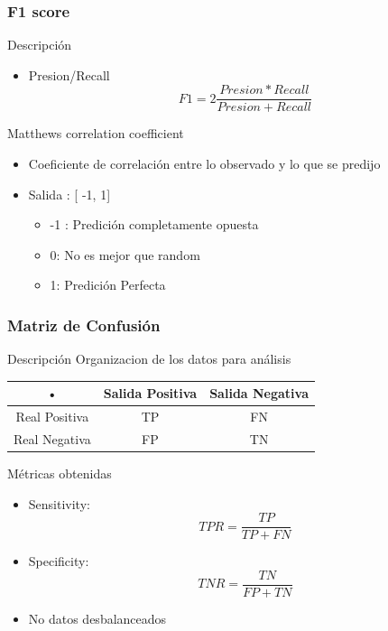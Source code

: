 \documentclass{beamer}
\begin{document}
\begin{frame}
  \frametitle{F1 score}

  \begin{block}{Descripci\'on}
  	\begin{itemize}
  	\item Presion/Recall
  	\[F1= 2 \dfrac{Presion*Recall}{Presion+Recall} \]   
  	\end{itemize}
  \end{block}
  \begin{block}{Matthews correlation coefficient}
  \begin{itemize}
  	\item Coeficiente de correlaci\'on entre lo observado y lo que se predijo
  	\item Salida : [ -1, 1] 
	\begin{itemize}
	\item -1 : Predici\'on completamente opuesta
	\item 0: No es mejor que random
	\item 1: Predici\'on Perfecta
\end{itemize}	  	
  \end{itemize}
  \end{block}
\end{frame}


\begin{frame}
  \frametitle{Matriz de Confusi\'on}

  \begin{block}{Descripci\'on}
  	Organizacion de los datos para an\'alisis
  	
  	\begin{tabular}{|c|c|c|}
  	\hline 
  	• & Salida Positiva & Salida Negativa \\ 
  	\hline 
  	Real Positiva & TP & FN \\ 
  	\hline 
  	Real Negativa & FP & TN \\ 
  	\hline 
  	\end{tabular} 
  \end{block}
  \begin{block}{M\'etricas obtenidas}
  \begin{itemize}
  	\item Sensitivity: \[TPR=  \dfrac{TP}{TP+FN} \]   
  	\item Specificity: \[TNR=  \dfrac{TN}{FP+TN} \]   
	\item No datos desbalanceados
    \end{itemize}
  
  \end{block}
\end{frame}
\end{document}
